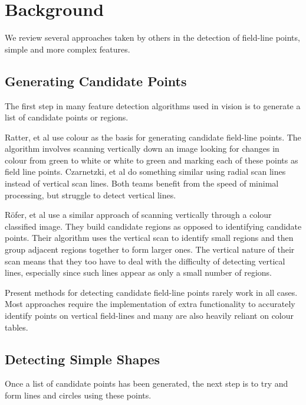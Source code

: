 \documentclass[runningheads,a4paper]{llncs}
\begin{document}
\pagebreak
\section{Background}

We review several approaches taken by others in the detection of field-line points, simple and more complex features. 

\subsection{Generating Candidate Points} 
The first step in many feature detection algorithms used in vision is to generate a list of candidate points or regions.

Ratter, et al \cite{rUNSWift2010} use colour as the basis for generating candidate field-line points. The algorithm involves scanning vertically down an image looking for changes in colour from green to white or white to green and marking each of these points as field line points. Czarnetzki, et al \cite{NaoDevils2010} do something similar using radial scan lines instead of vertical scan lines. Both teams benefit from the speed of minimal processing, but struggle to detect vertical lines.

R{\"o}fer, et al \cite{BHumanCodeRelease2010} use a similar approach of scanning vertically through a colour classified image. They build candidate regions as opposed to identifying candidate points. Their algorithm uses the vertical scan to identify small regions and then group adjacent regions together to form larger ones. The vertical nature of their scan means that they too have to deal with the difficulty of detecting  vertical lines, especially since such lines appear as only a small number of regions.

Present methods for detecting candidate field-line points rarely work in all cases. Most approaches require the implementation of extra functionality to accurately identify points on vertical field-lines and many are also heavily reliant on colour tables.

\subsection{Detecting Simple Shapes}

Once a list of candidate points has been generated, the next step is to try and form lines and circles using these points. 
\end{document}
